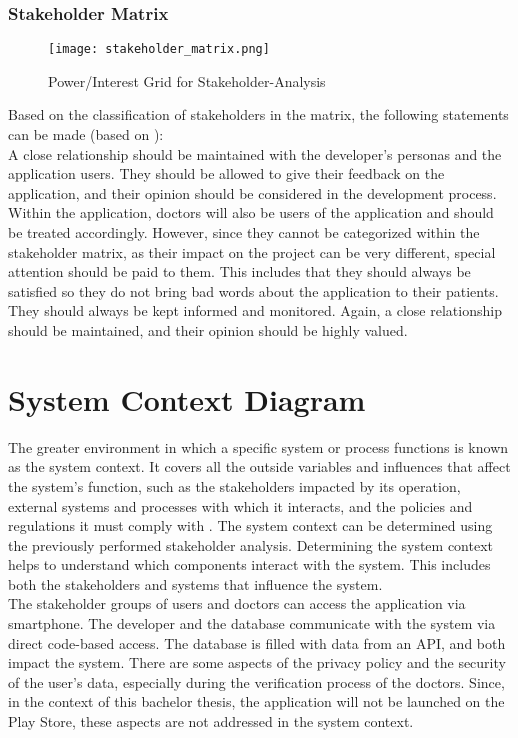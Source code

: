 \subsubsection{Stakeholder Matrix}
\begin{figure}[H]
	\centering
	\texttt{[image: stakeholder\_matrix.png]}
	\caption[Power/Interest Grid for Stakeholder-Analysis ]{Power/Interest Grid for Stakeholder-Analysis}
\end{figure}
\noindent	
Based on the classification of stakeholders in the matrix, the following statements can be made (based on \cite{.stakes}):
\newline \\
A close relationship should be maintained with the developer's personas and the application users. They should be allowed to give their feedback on the application, and their opinion should be considered in the development process.
\newline \\ 
Within the application, doctors will also be users of the application and should be treated accordingly. However, since they cannot be categorized within the stakeholder matrix, as their impact on the project can be very different, special attention should be paid to them. This includes that they should always be satisfied so they do not bring bad words about the application to their patients. They should always be kept informed and monitored. Again, a close relationship should be maintained, and their opinion should be highly valued.

\section{System Context Diagram}
The greater environment in which a specific system or process functions is known as the system context. It covers all the outside variables and influences that affect the system's function, such as the stakeholders impacted by its operation, external systems and processes with which it interacts, and the policies and regulations it must comply with \cite{.systemcontext}. The system context can be determined using the previously performed stakeholder analysis. Determining the system context helps to understand which components interact with the system. This includes both the stakeholders and systems that influence the system.
\newline \\
The stakeholder groups of users and doctors can access the application via smartphone. The developer and the database communicate with the system via direct code-based access. The database is filled with data from an API, and both impact the system. There are some aspects of the privacy policy and the security of the user's data, especially during the verification process of the doctors. Since, in the context of this bachelor thesis, the application will not be launched on the Play Store, these aspects are not addressed in the system context.

